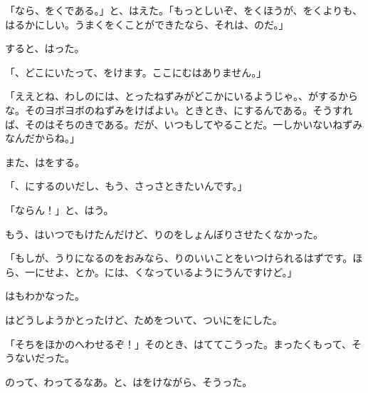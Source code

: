 「なら、をくである。」と、はえた。「もっとしいぞ、をくほうが、をくよりも、はるかにしい。うまくをくことができたなら、それは、のだ。」

すると、はった。

「、どこにいたって、をけます。ここにむはありません。」

「ええとね、わしのには、とったねずみがどこかにいるようじゃ。、がするからな。そのヨボヨボのねずみをけばよい。ときとき、にするんである。そうすれば、そのはそちのきである。だが、いつもしてやることだ。一しかいないねずみなんだからね。」

また、はをする。

「、にするのいだし、もう、さっさときたいんです。」

「ならん！」と、はう。

もう、はいつでもけたんだけど、りのをしょんぼりさせたくなかった。

「もしが、うりになるのをおみなら、りのいいことをいつけられるはずです。ほら、一にせよ、とか。には、くなっているようにうんですけど。」

はもわかなった。

はどうしようかとったけど、ためをついて、ついにをにした。

「そちをほかのへわせるぞ！」そのとき、はててこうった。まったくもって、そうないだった。

のって、わってるなあ。と、はをけながら、そうった。


